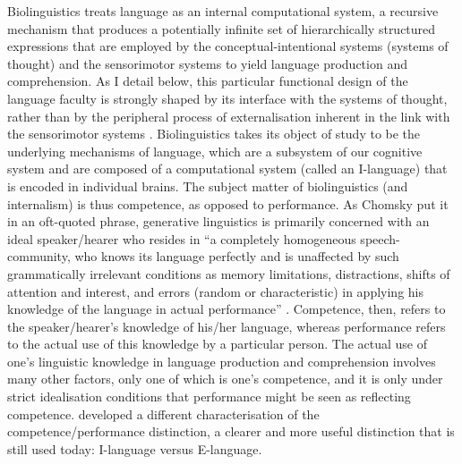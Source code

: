 Biolinguistics treats language as an internal computational system, a recursive mechanism that produces a potentially infinite set of hierarchically structured expressions that are employed by the conceptual-intentional systems (systems of thought) and the sensorimotor systems to yield language production and comprehension. As I detail below, this particular functional design of the language faculty is strongly shaped by its interface with the systems of thought, rather than by the peripheral process of externalisation inherent in the link with the sensorimotor systems \citep{Chomsky2013,Hinzen2013,Asoulin2016,BerwickChomsky2016}. Biolinguistics takes its object of study to be the underlying mechanisms of language, which are a subsystem of our cognitive system and are composed of a computational system (called an I-language) that is encoded in individual brains. The subject matter of biolinguistics (and internalism) is thus competence, as opposed to performance. As Chomsky put it in an oft-quoted phrase, generative linguistics is primarily concerned with an ideal speaker/hearer who resides in “a completely homogeneous speech-community, who knows its language perfectly and is unaffected by such grammatically irrelevant conditions as memory limitations, distractions, shifts of attention and interest, and errors (random or characteristic) in applying his knowledge of the language in actual performance” \citep[3]{Chomsky1965}. Competence, then, refers to the speaker/hearer’s knowledge of his/her language, whereas performance refers to the actual use of this knowledge by a particular person. The actual use of one’s linguistic knowledge in language production and comprehension involves many other factors, only one of which is one’s competence, and it is only under strict idealisation conditions that performance might be seen as reflecting competence. \citet{Chomsky1986} developed a different characterisation of the competence/performance distinction, a clearer and more useful distinction that is still used today: I-language versus E-language. 

